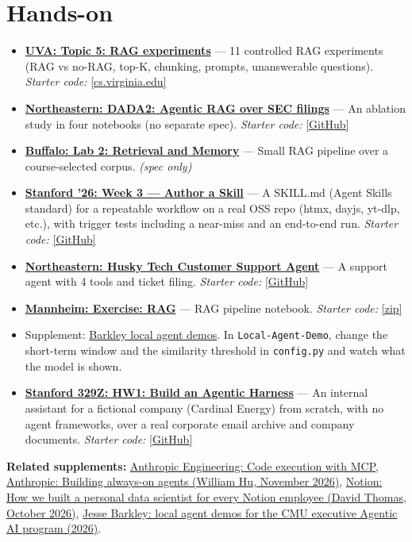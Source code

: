 \documentclass[10pt,oneside]{report}
\begin{document}
\section{Hands-on}
\begin{itemize}
\item \hyperlink{asg-UVA-5}{\textbf{UVA: Topic 5: RAG experiments}} --- 11 controlled RAG experiments (RAG vs no-RAG, top-K, chunking, prompts, unanswerable questions). \textit{Starter code:} \href{https://www.cs.virginia.edu/\%7Ermw7my/Courses/AgenticAISpring2026/Topic5RAG/rag.html}{[cs.virginia.edu]}
\item \hyperlink{asg-NEU-2}{\textbf{Northeastern: DADA2: Agentic RAG over SEC filings}} --- An ablation study in four notebooks (no separate spec). \textit{Starter code:} \href{https://github.com/agenticllms/lecture-files/tree/main/DADA2}{[GitHub]}
\item \hyperlink{asg-UB-2}{\textbf{Buffalo: Lab 2: Retrieval and Memory}} --- Small RAG pipeline over a course-selected corpus. \textit{(spec only)}
\item \hyperlink{asg-STAN26-3}{\textbf{Stanford '26: Week 3 --- Author a Skill}} --- A SKILL.md (Agent Skills standard) for a repeatable workflow on a real OSS repo (htmx, dayjs, yt-dlp, etc.), with trigger tests including a near-miss and an end-to-end run. \textit{Starter code:} \href{https://github.com/mihail911/modern-software-dev-assignments/blob/master/week3/assignment.md}{[GitHub]}
\item \hyperlink{asg-NEU-4}{\textbf{Northeastern: Husky Tech Customer Support Agent}} --- A support agent with 4 tools and ticket filing. \textit{Starter code:} \href{https://github.com/agenticllms/lecture-files/tree/main/W03b}{[GitHub]}
\item \hyperlink{asg-MANN-4}{\textbf{Mannheim: Exercise: RAG}} --- RAG pipeline notebook. \textit{Starter code:} \href{https://www.uni-mannheim.de/media/Einrichtungen/dws/Files_Teaching/Large_Language_Models_and_Agents/FSS2026/IE685_LA_EX_Retrieval_Augmented_Generation.zip}{[zip]}
\item Supplement: \hyperref[sup-barkley]{Barkley local agent demos}. In \texttt{Local-Agent-Demo}, change the short-term window and the similarity threshold in \texttt{config.py} and watch what the model is shown.
\item \hyperlink{asg-S329Z-1}{\textbf{Stanford 329Z: HW1: Build an Agentic Harness}} --- An internal assistant for a fictional company (Cardinal Energy) from scratch, with no agent frameworks, over a real corporate email archive and company documents. \textit{Starter code:} \href{https://github.com/cs329z/assignment1-harness}{[GitHub]}
\end{itemize}
\textbf{Related supplements:} \hyperref[sup-codeexec]{Anthropic Engineering: Code execution with MCP}, \hyperref[sup-alwayson]{Anthropic: Building always-on agents (William Hu, November 2026)}, \hyperref[sup-notion]{Notion: How we built a personal data scientist for every Notion employee (David Thomas, October 2026)}, \hyperref[sup-barkley]{Jesse Barkley: local agent demos for the CMU executive Agentic AI program (2026)}.
\end{document}
